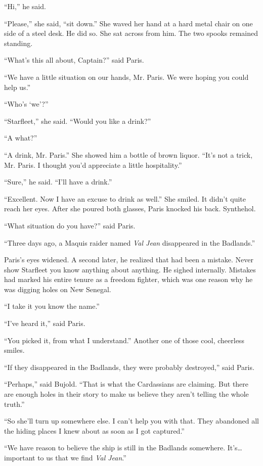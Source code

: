 \documentclass[twoside,letterpaper,12pt]{memoir}
\begin{document}
``Hi,'' he said.

``Please,'' she said, ``sit down.'' She waved her hand at a hard metal chair on one side of a steel desk. He did so. She sat across from him. The two spooks remained standing.

``What's this all about, Captain?'' said Paris.

``We have a little situation on our hands, Mr. Paris. We were hoping you could help us.''

``Who's ‘we'?''

``Starfleet,'' she said. ``Would you like a drink?''

``A what?''

``A drink, Mr. Paris.'' She showed him a bottle of brown liquor. ``It's not a trick, Mr. Paris. I thought you'd appreciate a little hospitality.''

``Sure,'' he said. ``I'll have a drink.''

``Excellent. Now I have an excuse to drink as well.'' She smiled. It didn't quite reach her eyes. After she poured both glasses, Paris knocked his back. Synthehol.

``What situation do you have?'' said Paris.

``Three days ago, a Maquis raider named \textit{Val Jean} disappeared in the Badlands.''

Paris's eyes widened. A second later, he realized that had been a mistake. Never show Starfleet you know anything about anything. He sighed internally. Mistakes had marked his entire tenure as a freedom fighter, which was one reason why he was digging holes on New Senegal.

``I take it you know the name.''

``I've heard it,'' said Paris.

``You picked it, from what I understand.'' Another one of those cool, cheerless smiles.

``If they disappeared in the Badlands, they were probably destroyed,'' said Paris.

``Perhaps,'' said Bujold. ``That is what the Cardassians are claiming. But there are enough holes in their story to make us believe they aren't telling the whole truth.''

``So she'll turn up somewhere else. I can't help you with that. They abandoned all the hiding places I knew about as soon as I got captured.''

``We have reason to believe the ship is still in the Badlands somewhere. It's\ldots important to us that we find \textit{Val Jean}.''
\end{document}
